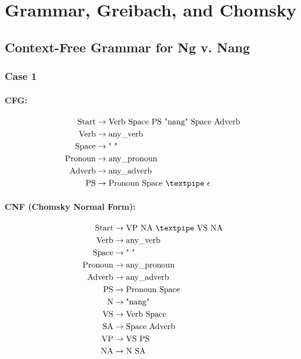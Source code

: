 \section{Grammar, Greibach, and Chomsky}
\subsection{Context-Free Grammar for Ng v. Nang}


\subsubsection{Case 1}

\paragraph{CFG:}

\begin{equation*}
    \begin{aligned}
        \text{Start} &\rightarrow \text{Verb Space PS "nang" Space Adverb} \\
        \text{Verb} &\rightarrow \text{any\_verb} \\
        \text{Space} &\rightarrow \text{" "} \\
        \text{Pronoun} &\rightarrow \text{any\_pronoun} \\
        \text{Adverb} &\rightarrow \text{any\_adverb} \\
        \text{PS} &\rightarrow \text{Pronoun Space {\textpipe} } \epsilon
    \end{aligned}
\end{equation*}

\paragraph{CNF (Chomsky Normal Form):}

\begin{equation*}
    \begin{aligned}
        \text{Start} &\rightarrow \text{VP NA {\textpipe} VS NA} \\
        \text{Verb} &\rightarrow \text{any\_verb} \\
        \text{Space} &\rightarrow \text{" "} \\
        \text{Pronoun} &\rightarrow \text{any\_pronoun} \\
        \text{Adverb} &\rightarrow \text{any\_adverb} \\
        \text{PS} &\rightarrow \text{Pronoun Space} \\
        \text{N} &\rightarrow \text{"nang"} \\
        \text{VS} &\rightarrow \text{Verb Space} \\
        \text{SA} &\rightarrow \text{Space Adverb} \\
        \text{VP} &\rightarrow \text{VS PS} \\
        \text{NA} &\rightarrow \text{N SA}
    \end{aligned}
\end{equation*}

